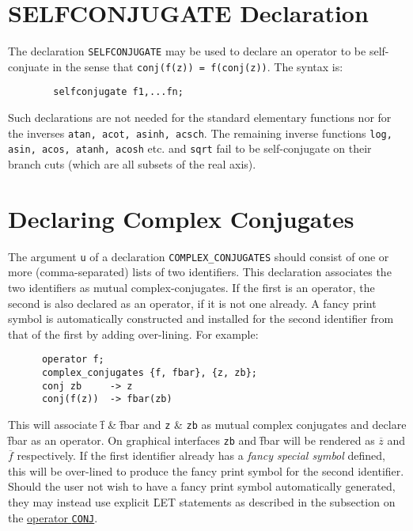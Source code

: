 \section{SELFCONJUGATE Declaration}
\hypertarget{command:SELFCONJUGATE}{}

The declaration \texttt{SELFCONJUGATE} may be used 
to declare an operator to be self-conjuate in the sense that
\texttt{conj(f(z)) = f(conj(z))}. The syntax is:
\begin{verbatim}
        selfconjugate f1,...fn;
\end{verbatim}

Such declarations are not needed for the standard elementary functions nor
for the inverses \texttt{atan, acot, asinh, acsch}. The remaining inverse
functions \texttt{log, asin, acos, atanh, acosh} etc. and
\texttt{sqrt} fail to be self-conjugate on their branch cuts (which are all
subsets of the real axis).

\section{Declaring Complex Conjugates}
\hypertarget{command:COMPLEX_CONJUGATES}{}
The argument \texttt{u} of a declaration \texttt{COMPLEX\_CONJUGATES} should
consist of one or more (comma-separated) lists of two identifiers.
This declaration associates the two identifiers as
mutual complex-conjugates. If the first is an operator, the second is
also declared as an operator, if it is not one already. A fancy print symbol 
is automatically constructed and installed for the second identifier
from that of the first by adding over-lining. For example:
\begin{verbatim} 
      operator f;
      complex_conjugates {f, fbar}, {z, zb};
      conj zb     -> z
      conj(f(z))  -> fbar(zb)  
\end{verbatim}
This will associate \f{f} \& \f{fbar} and \texttt{z} \& \texttt{zb}
as mutual complex conjugates and declare \f{fbar} as an operator.
On graphical interfaces \texttt{zb} and \f{fbar} will be rendered as
$\overline{z}$ and $\overline{f}$ respectively. If the first identifier
already has a \emph{fancy special symbol} defined, this will be over-lined
to produce the fancy print symbol for the second identifier.
Should the user not wish to have a fancy print symbol automatically generated,
they may instead use explicit \f{LET} statements as described in the 
subsection on the \hyperlink{CONJ}{operator \texttt{CONJ}}.

